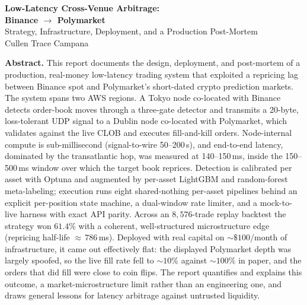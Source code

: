 \documentclass{tmsce}
\begin{document}
\begin{titlepage}
    \vspace*{2.1cm}
    \begin{center}
        {\LARGE\bfseries Low-Latency Cross-Venue Arbitrage:\\[0.4em]
         Binance $\rightarrow$ Polymarket} \\[1.1em]
        {\large Strategy, Infrastructure, Deployment, and a Production Post-Mortem} \\[1.6em]
        {\large Cullen Trace Campana}
    \end{center}
    \vspace{1.9em}
    \begin{center}
    \begin{minipage}{0.86\textwidth}
        \small
        \setlength{\parindent}{0pt}
        \textbf{Abstract.} This report documents the design, deployment, and
        post-mortem of a production, real-money low-latency trading system that
        exploited a repricing lag between Binance spot and Polymarket's short-dated
        crypto prediction markets. The system spans two AWS regions. A Tokyo node
        co-located with Binance detects order-book moves through a three-gate detector
        and transmits a 20-byte, loss-tolerant UDP signal to a Dublin node co-located
        with Polymarket, which validates against the live CLOB and executes
        fill-and-kill orders. Node-internal compute is sub-millisecond (signal-to-wire
        50--200\,\textmu s), and end-to-end latency, dominated by the transatlantic
        hop, was measured at 140--150\,ms, inside the 150--500\,ms window over which
        the target book reprices. Detection is calibrated per asset with Optuna and
        augmented by per-asset LightGBM and random-forest meta-labeling; execution runs
        eight shared-nothing per-asset pipelines behind an explicit per-position state
        machine, a dual-window rate limiter, and a mock-to-live harness with exact API
        parity.
        Across an $8{,}576$-trade replay backtest the strategy won $61.4\%$ with a
        coherent, well-structured microstructure edge (repricing half-life
        ${\approx}\,786$\,ms). Deployed with real capital on ${\sim}\$100$/month of
        infrastructure, it came out effectively flat: the displayed Polymarket depth
        was largely spoofed, so the live fill rate fell to ${\sim}10\%$ against
        ${\sim}100\%$ in paper, and the orders that did fill were close to coin flips.
        The report quantifies and explains this outcome, a market-microstructure limit
        rather than an engineering one, and draws general lessons for latency arbitrage
        against untrusted liquidity.
    \end{minipage}
    \end{center}
    \vfill
\end{titlepage}
\end{document}
